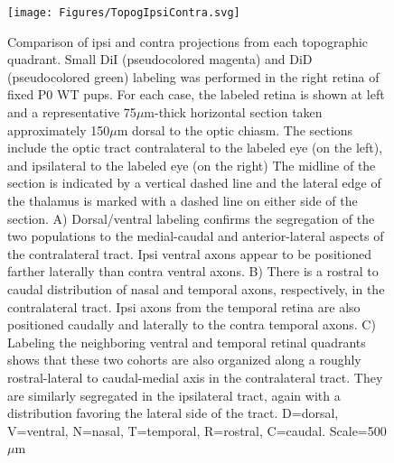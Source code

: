 \begin{figure}[hbtp]
	\begin{center}
		\texttt{[image: Figures/TopogIpsiContra.svg]}
		\caption[Comparison of ipsi and contra projections from each topographic quadrant.]
		{Comparison of ipsi and contra projections from each topographic quadrant.
		Small DiI (pseudocolored magenta) and DiD (pseudocolored green) labeling was performed in the right retina of fixed P0 WT pups.
		For each case, the labeled retina is shown at left and a representative 75$\mu$m-thick horizontal section taken approximately 150$\mu$m dorsal to the optic chiasm.
		The sections include the optic tract contralateral to the labeled eye (on the left), and ipsilateral to the labeled eye (on the right)
		The midline of the section is indicated by a vertical dashed line and the lateral edge of the thalamus is marked with a dashed line on either side of the section.
		A) Dorsal/ventral labeling confirms the segregation of the two populations to the medial-caudal and anterior-lateral aspects of the contralateral tract.
		Ipsi ventral axons appear to be positioned farther laterally than contra ventral axons.
		B) There is a rostral to caudal distribution of nasal and temporal axons, respectively, in the contralateral tract.
		Ipsi axons from the temporal retina are also positioned caudally and laterally to the contra temporal axons.
		C) Labeling the neighboring ventral and temporal retinal quadrants shows that these two cohorts are also organized along a roughly rostral-lateral to caudal-medial axis in the contralateral tract.
		They are similarly segregated in the ipsilateral tract, again with a distribution favoring the lateral side of the tract.
		D=dorsal, V=ventral, N=nasal, T=temporal, R=rostral, C=caudal. Scale=500$\mu$m}
		\label{Figures/TopogIpsiContra}
	\end{center}
\end{figure}

